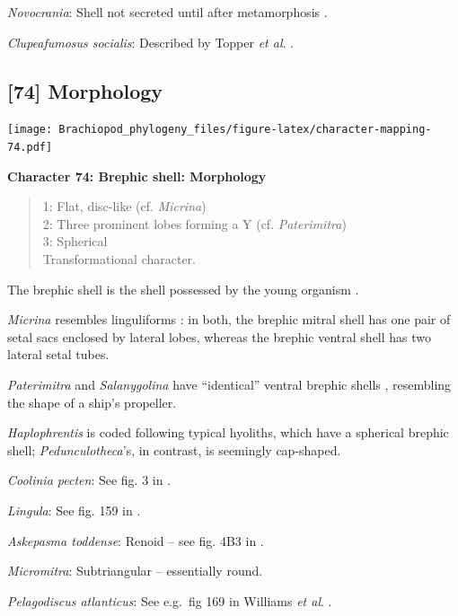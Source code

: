 \documentclass[openany]{book}
\theoremstyle{definition}
\theoremstyle{definition}
\theoremstyle{definition}
\theoremstyle{remark}
\begin{document}
\emph{Novocrania}: Shell not secreted until after metamorphosis
\citep{Popov2010Earliestontogeny}.

\emph{Clupeafumosus socialis}: Described by Topper \emph{et al}.
\citeyearpar{Topper2013Reappraisalof}.

\hypertarget{morphology}{%
\subsection*{{[}74{]} Morphology}\label{morphology}}

\texttt{[image: Brachiopod\_phylogeny\_files/figure-latex/character-mapping-74.pdf]}

\textbf{Character 74: Brephic shell: Morphology}

\begin{quote}
1: Flat, disc-like (cf. \emph{Micrina})\\
2: Three prominent lobes forming a Y (cf. \emph{Paterimitra})\\
3: Spherical\\
Transformational character.
\end{quote}

The brephic shell is the shell possessed by the young organism
\citep[see][ and references therein for discussion of
terminology]{Ushatinskaya2016Revisionof}.

\emph{Micrina} resembles linguliforms \citep{Holmer2011Firstrecord}: in
both, the brephic mitral shell has one pair of setal sacs enclosed by
lateral lobes, whereas the brephic ventral shell has two lateral setal
tubes.

\emph{Paterimitra} and \emph{Salanygolina} have ``identical'' ventral
brephic shells \citep{Holmer2011Firstrecord}, resembling the shape of a
ship's propeller.

\emph{Haplophrentis} is coded following typical hyoliths, which have a
spherical brephic shell; \emph{Pedunculotheca}'s, in contrast, is
seemingly cap-shaped.

\emph{Coolinia pecten}: See fig. 3 in
\citet{Bassett2017Earliestontogeny}.

\emph{Lingula}: See fig. 159 in \citet{Williams1997BrachiopodaRevised}.

\emph{Askepasma toddense}: Renoid -- see fig. 4B3 in
\citet{Topper2013Theoldest}.

\emph{Micromitra}: Subtriangular -- essentially round.

\emph{Pelagodiscus atlanticus}: See e.g.~fig 169 in Williams \emph{et
al}. \citeyearpar{Williams1997BrachiopodaRevised}.
\end{document}
